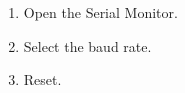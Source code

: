 \begin{enumerate}
\item Open the Serial Monitor.
\item Select the baud rate.
\item Reset.
\end{enumerate}


